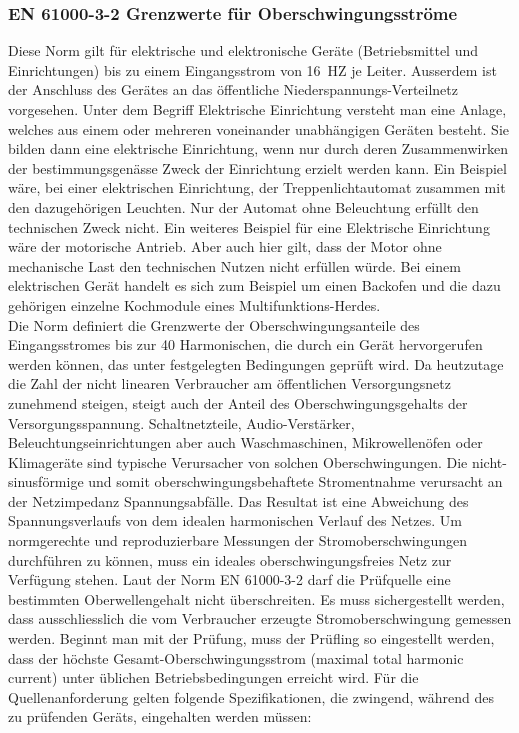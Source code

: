 \subsubsection{EN 61000-3-2 Grenzwerte für Oberschwingungsströme}
Diese Norm gilt für elektrische und elektronische Geräte (Betriebsmittel und Einrichtungen) bis zu einem Eingangsstrom von \SI{16}{HZ} je Leiter. Ausserdem ist der Anschluss des Gerätes an das öffentliche Niederspannungs-Verteilnetz vorgesehen. Unter dem Begriff Elektrische Einrichtung versteht man eine Anlage, welches aus einem oder mehreren voneinander unabhängigen Geräten besteht. Sie bilden dann eine elektrische Einrichtung, wenn nur durch deren Zusammenwirken der bestimmungsgenässe Zweck der Einrichtung erzielt werden kann. Ein Beispiel wäre, bei einer elektrischen Einrichtung, der Treppenlichtautomat zusammen mit den dazugehörigen Leuchten. Nur der Automat ohne Beleuchtung erfüllt den technischen Zweck nicht. Ein weiteres Beispiel für eine Elektrische Einrichtung wäre der motorische Antrieb. Aber auch hier gilt, dass der Motor ohne mechanische Last den technischen Nutzen nicht erfüllen würde. Bei einem elektrischen Gerät handelt es sich zum Beispiel um einen Backofen und die dazu gehörigen einzelne Kochmodule eines Multifunktions-Herdes.\\
Die Norm definiert die Grenzwerte der Oberschwingungsanteile des Eingangsstromes bis zur 40 Harmonischen, die durch ein Gerät hervorgerufen werden können, das unter festgelegten Bedingungen geprüft wird. Da heutzutage die Zahl der nicht linearen Verbraucher am öffentlichen Versorgungsnetz zunehmend steigen, steigt auch der Anteil des Oberschwingungsgehalts der Versorgungsspannung. Schaltnetzteile, Audio-Verstärker, Beleuchtungseinrichtungen aber auch Waschmaschinen, Mikrowellenöfen oder Klimageräte sind typische Verursacher von solchen Oberschwingungen.
Die nicht-sinusförmige und somit oberschwingungsbehaftete Stromentnahme verursacht an der Netzimpedanz Spannungsabfälle. Das Resultat ist eine Abweichung des Spannungsverlaufs von dem idealen harmonischen Verlauf des Netzes. Um normgerechte und reproduzierbare Messungen der Stromoberschwingungen durchführen zu können, muss ein ideales oberschwingungsfreies Netz zur Verfügung stehen. Laut der Norm EN 61000-3-2 darf die Prüfquelle eine bestimmten Oberwellengehalt nicht überschreiten. Es muss sichergestellt werden, dass ausschliesslich die vom Verbraucher erzeugte Stromoberschwingung gemessen werden. Beginnt man mit der Prüfung, muss der Prüfling so eingestellt werden, dass der höchste Gesamt-Oberschwingungsstrom (maximal total harmonic current) unter üblichen Betriebsbedingungen erreicht wird.
Für die Quellenanforderung gelten folgende Spezifikationen, die zwingend, während des zu prüfenden Geräts, eingehalten werden müssen:

